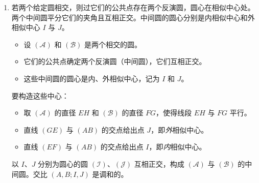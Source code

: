 \begin{enumerate}[label=(\roman*)]
\item 若两个给定圆相交，则过它们的公共点存在两个反演圆，圆心在相似中心处。两个中间圆平分它们的夹角且互相正交。中间圆的圆心分别是内相似中心和外相似中心 $I$ 与 $J$。

\begin{itemize}
  \item 设 $(\mathcal{A})$ 和 $(\mathcal{B})$ 是两个相交的圆。
  \item 它们的公共点确定两个反演圆（中间圆），它们互相正交。
  \item 这些中间圆的圆心是内、外相似中心，记为 $I$ 和 $J$。
\end{itemize}


要构造这些中心：
\begin{itemize}
  \item 取 $(\mathcal{A})$ 的直径 $EH$ 和 $(\mathcal{B})$ 的直径 $FG$，使得线段 $EH$ 与 $FG$ 平行。
  \item 直线 $(GE)$ 与 $(AB)$ 的交点给出点 $J$，即\emph{外}相似中心。
  \item 直线 $(EF)$ 与 $(AB)$ 的交点给出点 $I$，即\emph{内}相似中心。
\end{itemize}


以 $I$、$J$ 分别为圆心的圆 $(\mathcal{I})$、$(\mathcal{J})$ 互相正交，构成 $(\mathcal{A})$ 与 $(\mathcal{B})$ 的中间圆。交比 $(A,B;I,J)$ 是调和的。

\vspace{1em}


\end{enumerate}
